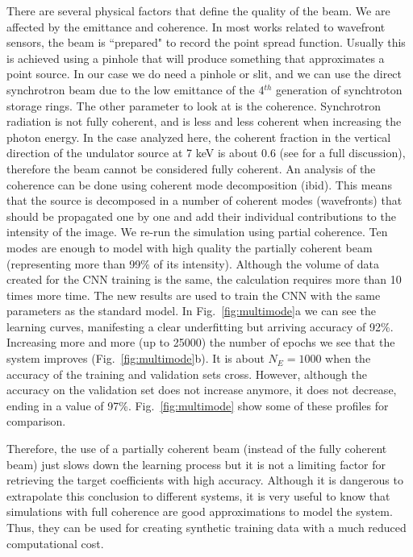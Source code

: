 \documentclass[preprint]{iucr}
\begin{document}
There are several physical factors that define the quality of the beam. We are affected by the emittance and coherence. In most works related to wavefront sensors, the beam is ``prepared" to record the point spread function. Usually this is achieved using a pinhole that will produce something that approximates a point source. In our case we do need a pinhole or slit, and we can use the direct synchrotron beam due to the low emittance of the 4$^{th}$ generation of synchtroton storage rings. The other parameter to look at is the coherence. Synchrotron radiation is not fully coherent, and is less and less coherent when increasing the photon energy. In the case analyzed here, the coherent fraction in the vertical direction of the undulator source at 7 keV is about 0.6 (see \cite{SanchezdelRio:ay5600} for a full discussion), therefore the beam cannot be considered fully coherent. An analysis of the coherence can be done using coherent mode decomposition (ibid). This means that the source is decomposed in a number of coherent modes (wavefronts) that should be propagated one by one and add their individual contributions to the intensity of the image. We re-run the simulation using partial coherence. Ten modes are enough to model with high quality the partially coherent beam (representing more than 99\% of its intensity). Although the volume of data created for the CNN training is the same, the calculation requires more than 10 times more time. The new results are used to train the CNN with the same parameters as the standard model. In Fig.~\ref{fig:multimode}a we can see the learning curves, manifesting a clear underfitting but arriving accuracy of 92\%. Increasing more and more (up to 25000) the number of epochs we see that the system improves (Fig.~\ref{fig:multimode}b). It is about $N_E=1000$ when the accuracy of the training and validation sets cross. However, although the accuracy on the validation set does not increase anymore, it does not decrease, ending in a value of 97\%. Fig.~\ref{fig:multimode} show some of these profiles for comparison.

Therefore, the use of a partially coherent beam (instead of the fully coherent beam) just slows down the learning process but it is not a limiting factor for retrieving the target coefficients with high accuracy. Although it is dangerous to extrapolate this conclusion to different systems, it is very useful to know that simulations with full coherence are good approximations to model the system. Thus, they can be used for creating synthetic training data with a much reduced computational cost. 
\end{document}
